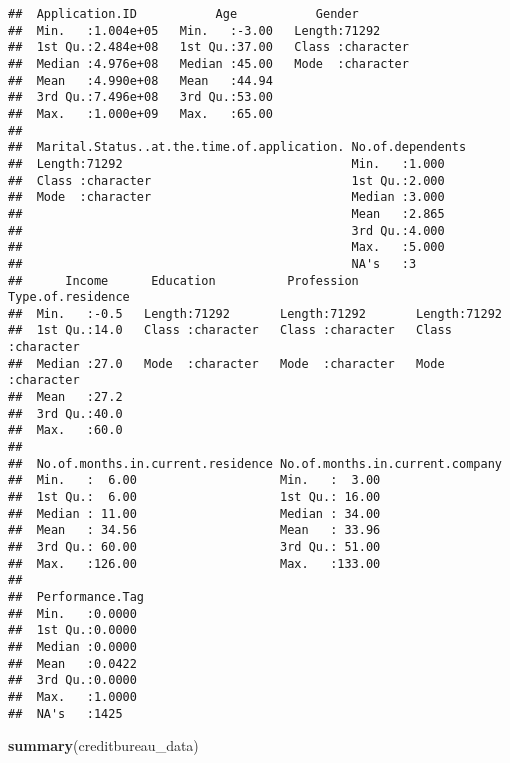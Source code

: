 \documentclass[]{article}
\newenvironment{Shaded}{\begin{snugshade}}{\end{snugshade}}
\newcommand{\KeywordTok}[1]{\textcolor[rgb]{0.13,0.29,0.53}{\textbf{{#1}}}}
\newcommand{\NormalTok}[1]{{#1}}
\begin{document}
\begin{verbatim}
##  Application.ID           Age           Gender         
##  Min.   :1.004e+05   Min.   :-3.00   Length:71292      
##  1st Qu.:2.484e+08   1st Qu.:37.00   Class :character  
##  Median :4.976e+08   Median :45.00   Mode  :character  
##  Mean   :4.990e+08   Mean   :44.94                     
##  3rd Qu.:7.496e+08   3rd Qu.:53.00                     
##  Max.   :1.000e+09   Max.   :65.00                     
##                                                        
##  Marital.Status..at.the.time.of.application. No.of.dependents
##  Length:71292                                Min.   :1.000   
##  Class :character                            1st Qu.:2.000   
##  Mode  :character                            Median :3.000   
##                                              Mean   :2.865   
##                                              3rd Qu.:4.000   
##                                              Max.   :5.000   
##                                              NA's   :3       
##      Income      Education          Profession        Type.of.residence 
##  Min.   :-0.5   Length:71292       Length:71292       Length:71292      
##  1st Qu.:14.0   Class :character   Class :character   Class :character  
##  Median :27.0   Mode  :character   Mode  :character   Mode  :character  
##  Mean   :27.2                                                           
##  3rd Qu.:40.0                                                           
##  Max.   :60.0                                                           
##                                                                         
##  No.of.months.in.current.residence No.of.months.in.current.company
##  Min.   :  6.00                    Min.   :  3.00                 
##  1st Qu.:  6.00                    1st Qu.: 16.00                 
##  Median : 11.00                    Median : 34.00                 
##  Mean   : 34.56                    Mean   : 33.96                 
##  3rd Qu.: 60.00                    3rd Qu.: 51.00                 
##  Max.   :126.00                    Max.   :133.00                 
##                                                                   
##  Performance.Tag 
##  Min.   :0.0000  
##  1st Qu.:0.0000  
##  Median :0.0000  
##  Mean   :0.0422  
##  3rd Qu.:0.0000  
##  Max.   :1.0000  
##  NA's   :1425
\end{verbatim}

\begin{Shaded}
\begin{Highlighting}[]
\KeywordTok{summary}\NormalTok{(creditbureau_data)}
\end{Highlighting}
\end{Shaded}
\end{document}
